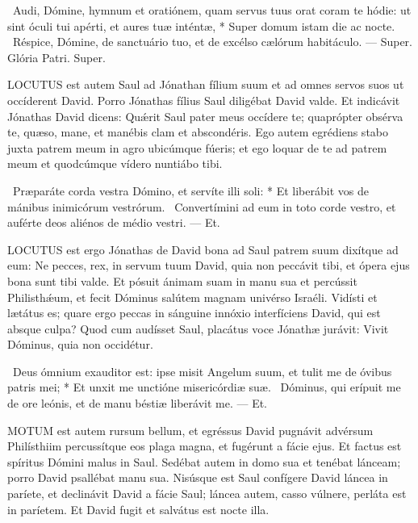 \R\ Audi, Dómine, hymnum et oratiónem, quam servus tuus orat coram te hódie: ut sint óculi tui apérti, et aures tuæ inténtæ, * Super domum istam die ac nocte. \V\ Réspice, Dómine, de sanctuário tuo, et de excélso cælórum habitáculo. --- Super. Glória Patri. Super.




\lettrine[lines=2]{L}{OCUTUS} est autem Saul ad Jónathan fílium suum et ad omnes servos suos ut occíderent David. Porro Jónathas fílius Saul diligébat David valde. Et indicávit Jónathas David dicens: Quǽrit Saul pater meus occídere te; quaprópter obsérva te, quæso, mane, et manébis clam et abscondéris. Ego autem egrédiens stabo juxta patrem meum in agro ubicúmque fúeris; et ego loquar de te ad patrem meum et quodcúmque vídero nuntiábo tibi.

\R\ Præparáte corda vestra Dómino, et servíte illi soli: * Et liberábit vos de mánibus inimicórum vestrórum. \V\ Convertímini ad eum in toto corde vestro, et auférte deos aliénos de médio vestri. --- Et.


\lettrine[lines=2]{L}{OCUTUS} est ergo Jónathas de David bona ad Saul patrem suum dixítque ad eum: Ne pecces, rex, in servum tuum David, quia non peccávit tibi, et ópera ejus bona sunt tibi valde. Et pósuit ánimam suam in manu sua et percússit Philisthǽum, et fecit Dóminus salútem magnam univérso Israéli. Vidísti et lætátus es; quare ergo peccas in sánguine innóxio interfíciens David, qui est absque culpa? Quod cum audísset Saul, placátus voce Jónathæ jurávit: Vivit Dóminus, quia non occidétur.

\R\ Deus ómnium exauditor est: ipse misit Angelum suum, et tulit me de óvibus patris mei; * Et unxit me unctióne misericórdiæ suæ. \V\ Dóminus, qui erípuit me de ore leónis, et de manu béstiæ liberávit me. --- Et.



\lettrine[lines=2]{M}{OTUM} est autem rursum bellum, et egréssus David pugnávit advérsum Philísthiim percussítque eos plaga magna, et fugérunt a fácie ejus. Et factus est spíritus Dómini malus in Saul. Sedébat autem in domo sua et tenébat lánceam; porro David psallébat manu sua. Nisúsque est Saul confígere David láncea in paríete, et declinávit David a fácie Saul; láncea autem, casso vúlnere, perláta est in paríetem. Et David fugit et salvátus est nocte illa.

